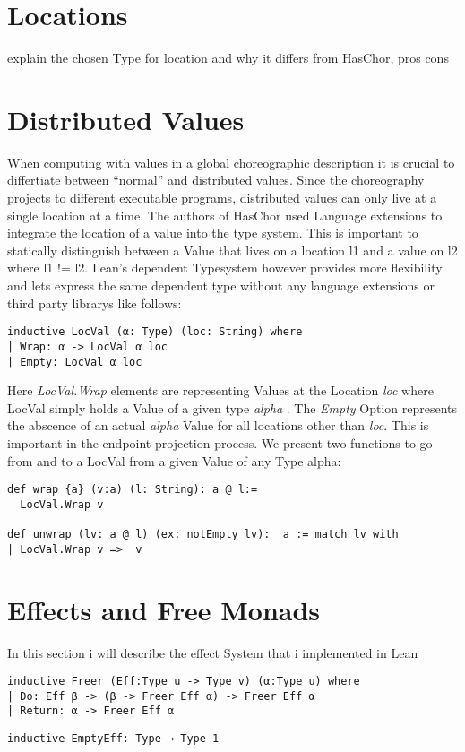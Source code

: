 \section{Locations}

explain the chosen Type for location and why it differs from HasChor, pros cons

\section{Distributed Values}
When computing with values in a global choreographic description it is crucial to differtiate between ``normal'' and distributed values. Since the choreography projects to different executable programs, distributed values can only live at a single location at a time. The authors of HasChor used Language extensions to integrate the location of a value into the type system. This is important to statically distinguish between a Value that lives on a location l1 and a value on l2 where l1 != l2.
Lean's dependent Typesystem however provides more flexibility and lets express the same dependent type without any language extensions or third party librarys like follows:
\begin{lstlisting}[language=lean]
inductive LocVal (α: Type) (loc: String) where
| Wrap: α -> LocVal α loc
| Empty: LocVal α loc
\end{lstlisting}
Here \emph{LocVal.Wrap} elements are representing Values at the Location \emph{loc} where LocVal simply holds a Value of a given type \emph{ alpha }.
The \emph{Empty} Option represents the abscence of an actual \emph{alpha} Value for all locations other than \emph{loc}. This is important in the endpoint projection process. We present two functions to go from and to a LocVal from a given Value of any Type alpha:

\begin{lstlisting}[language=lean]
def wrap {a} (v:a) (l: String): a @ l:=
  LocVal.Wrap v

def unwrap (lv: a @ l) (ex: notEmpty lv):  a := match lv with
| LocVal.Wrap v =>  v

\end{lstlisting}

\section{Effects and Free Monads}
In this section i will describe the effect System that i implemented in Lean

\begin{lstlisting}[language=lean]
inductive Freer (Eff:Type u -> Type v) (α:Type u) where
| Do: Eff β -> (β -> Freer Eff α) -> Freer Eff α
| Return: α -> Freer Eff α
\end{lstlisting}


\begin{lstlisting}[language=lean]
inductive EmptyEff: Type → Type 1
\end{lstlisting}

\begin{lstlisting}[language=lean]
\end{lstlisting}

